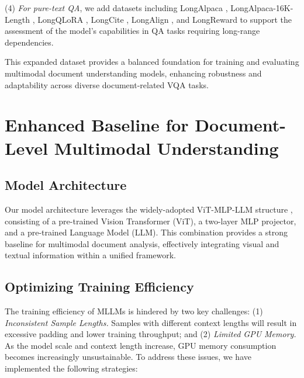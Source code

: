 \documentclass[10pt,twocolumn,letterpaper]{article}
\begin{document}
\begin{CJK}{UTF8}{gbsn}
(4) \emph{For pure-text QA}, we add datasets including LongAlpaca \cite{chen2023longlora}, LongAlpaca-16K-Length \cite{chen2023longlora}, LongQLoRA \cite{yang2023longqlora}, LongCite \cite{zhang2024longcite}, LongAlign \cite{bai2024longalign}, and LongReward \cite{zhang2024longreward} to support the assessment of the model's capabilities in QA tasks requiring long-range dependencies.


This expanded dataset provides a balanced foundation for training and evaluating multimodal document understanding models, enhancing robustness and adaptability across diverse document-related VQA tasks.



\section{Enhanced Baseline for Document-Level Multimodal Understanding}

\subsection{Model Architecture}
Our model architecture leverages the widely-adopted ViT-MLP-LLM structure \cite{liu2023llava, liu2023improved, InternVL2}, consisting of a pre-trained Vision Transformer (ViT), a two-layer MLP projector, and a pre-trained Language Model (LLM). This combination provides a strong baseline for multimodal document analysis, effectively integrating visual and textual information within a unified framework.



\subsection{Optimizing Training Efficiency}

The training efficiency of MLLMs is hindered by two key challenges: (1) \emph{Inconsistent Sample Lengths.} Samples with different context lengths will result in excessive padding and lower training throughput; and (2) \emph{Limited GPU Memory.} 
As the model scale and context length increase, GPU memory consumption becomes increasingly unsustainable. To address these issues, we have implemented the following strategies:


\end{CJK}
\end{document}
